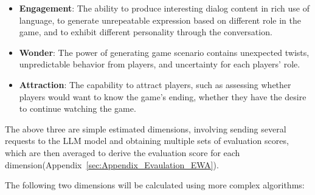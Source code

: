 \documentclass[11pt]{article}
\begin{document}
\begin{itemize}
  \item \textbf{Engagement}: The ability to produce interesting dialog content in rich use of language, to generate unrepeatable expression based on different role in the game, and to exhibit different personality through the conversation.
  \item \textbf{Wonder}: The power of generating game scenario contains unexpected twists, unpredictable behavior from players, and uncertainty for each players' role.
  \item \textbf{Attraction}: The capability to attract players, such as assessing whether players would want to know the game's ending, whether they have the desire to continue watching the game.
\end{itemize}

The above three are simple estimated dimensions, involving sending several requests to the LLM model and obtaining multiple sets of evaluation scores, which are then averaged to derive the evaluation score for each dimension(Appendix~\ref{sec:Appendix_Evaulation_EWA}). 

The following two dimensions will be calculated using more complex algorithms:
\end{document}
